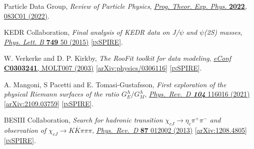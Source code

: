 \documentclass[a4paper,11pt]{article}
\begin{document}
\begin{thebibliography}{**}
 Particle Data Group,  
\textit{Review of Particle Physics}, 
\href{https://academic.oup.com/ptep/article/2022/8/083C01/6651666?login=false}{\textit{Prog. Theor. Exp. Phys.} {\bf 2022}, 083C01 (2022)}.

KEDR Collaboration,
\textit{Final analysis of KEDR data on J/\ensuremath{\psi} and \ensuremath{\psi}(2S) masses}, 
\href{https://www.sciencedirect.com/science/article/pii/S0370269315005675?ref=pdf_download&fr=RR-2&rr=74e9b2951ccf8b29}{\textit{Phys. Lett. B} {\bf 749} 50 (2015)}
[\textcolor{blue}{\href{https://inspirehep.net/literature/1386545}{\textsc{inSPIRE}}}].

 W. Verkerke and D. P. Kirkby,
\textit{The RooFit toolkit for data modeling},
\href{https:arxiv.org/abs/physics/0306116}{\textit{eConf} {\bf C0303241}, MOLT007 (2003)}
[\textcolor{blue}{\href{https://arxiv.org/pdf/physics/0306116.pdf}{arXiv:physics/0306116}}] 
[\textcolor{blue}{\href{https://inspirehep.net/literature/621398}{\textsc{inSPIRE}}}].

 A. Mangoni, S Pacetti and E. Tomasi-Gustafsson,
\textit{First exploration of the physical Riemann surfaces of the ratio ${G}_{E}^{\mathrm{\ensuremath{\Lambda}}}/{G}_{M}^{\mathrm{\ensuremath{\Lambda}}}$}, 
\href{https://journals.aps.org/prd/abstract/10.1103/PhysRevD.104.116016}{\textit{Phys.\ Rev.\ D {\bf 104}} 116016 (2021)}
[\textcolor{blue}{\href{https://arxiv.org/pdf/2109.03759.pdf}{arXiv:2109.03759}}] 
[\textcolor{blue}{\href{https://inspirehep.net/literature/1918614}{\textsc{inSPIRE}}}].

 BESIII Collaboration, 
 \textit{Search for hadronic transition ${\ensuremath{\chi}}_{cJ}\ensuremath{\rightarrow}{\ensuremath{\eta}}_{c}{\ensuremath{\pi}}^{+}{\ensuremath{\pi}}^{\ensuremath{-}}$ and observation of ${\ensuremath{\chi}}_{cJ}\ensuremath{\rightarrow}K\overline{K}\ensuremath{\pi}\ensuremath{\pi}\ensuremath{\pi}$}, 
\href{https://journals.aps.org/prd/abstract/10.1103/PhysRevD.87.012002}{\textit{Phys.\ Rev.\ D} {\bf 87} 012002 (2013)}
[\textcolor{blue}{\href{https://arxiv.org/pdf/1208.4805.pdf}{arXiv:1208.4805}}] 
[\textcolor{blue}{\href{https://inspirehep.net/literature/1180200}{\textsc{inSPIRE}}}].

 \end{thebibliography}
\end{document}

